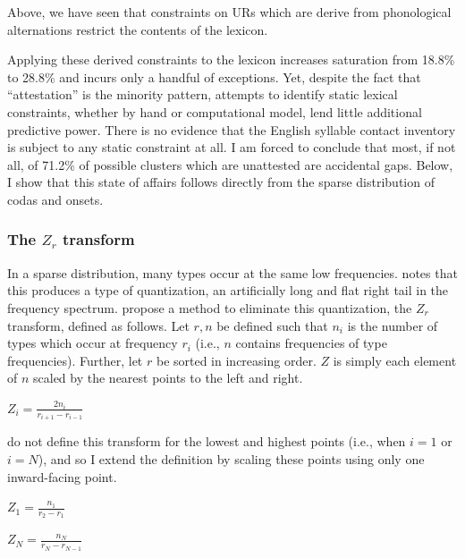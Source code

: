 Above, we have seen that constraints on URs which are derive from phonological alternations restrict the contents of the lexicon. 


Applying these derived constraints to the lexicon increases saturation from 18.8\% to 28.8\% and incurs only a handful of exceptions. Yet, despite the fact that ``attestation'' is the minority pattern, attempts to identify static lexical constraints, whether by hand or computational model, lend little additional predictive power. There is no evidence that the English syllable contact inventory is subject to any static constraint at all. I am forced to conclude that most, if not all, of 71.2\% of possible clusters which are unattested are accidental gaps. Below, I show that this state of affairs follows directly from the sparse distribution of codas and onsets. 

\subsubsection{The $Z_r$ transform}

In a sparse distribution, many types occur at the same low frequencies. \citet{Good1953} notes that this produces a type of quantization, an artificially long and flat right tail in the frequency spectrum. \citet[][29]{Church1991} propose a method to eliminate this quantization, the $Z_r$ transform, defined as follows.
Let $r, n$ be defined such that $n_i$ is the number of types which occur at frequency $r_i$ (i.e., $n$ contains frequencies of type frequencies). Further, let $r$ be sorted in increasing order. $Z$ is simply each element of $n$ scaled by the nearest points to the left and right. 

\begin{unlabeledexample}
$\displaystyle Z_i = \frac{2 n_i}{r_{i + 1} - r_{i - 1}}$
\end{unlabeledexample}

\noindent \citeauthor{Church1991} do not define this transform for the lowest and highest points (i.e., when $i = 1$ or $i = N$), and so I extend the definition by scaling these points using only one inward-facing point.

\begin{unlabeledexample}
$\displaystyle Z_1 = \frac{n_1}{r_2 - r_1}$
\end{unlabeledexample}

\begin{unlabeledexample}
$\displaystyle Z_N = \frac{n_N}{r_N - r_{N - 1}}$
\end{unlabeledexample}

